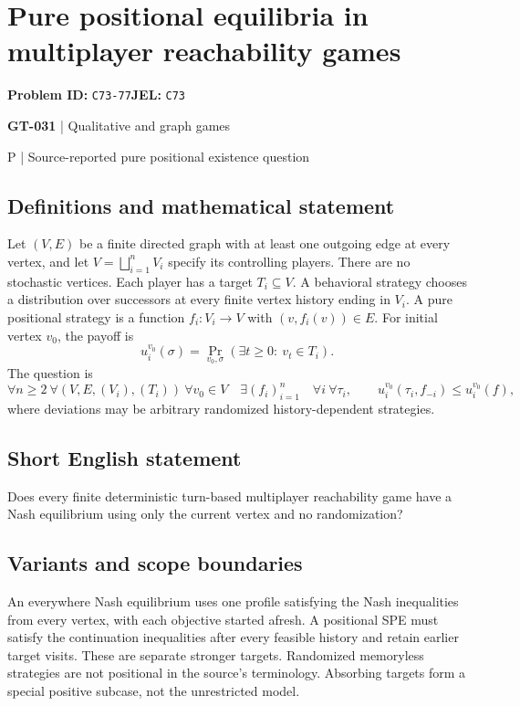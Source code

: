 \documentclass[11pt,a4paper]{article}
\begin{document}
\section*{Pure positional equilibria in multiplayer reachability games}
\textbf{Problem ID:} \texttt{C73-77}\quad \textbf{JEL:} \texttt{C73}\par
\label{problem:OP-0161}
\label{game:GT-031}
{\sffamily\small\color{muted}
{\sffamily\small\color{muted}\textbf{GT-031} | Qualitative and graph games\par P | Source-reported pure positional existence question\par}
\par}
\subsection*{Definitions and mathematical statement}
Let $(V,E)$ be a finite directed graph with at least one outgoing edge at every vertex, and let $V=\bigsqcup_{i=1}^{n}V_i$ specify its controlling players. There are no stochastic vertices. Each player has a target $T_i\subseteq V$. A behavioral strategy chooses a distribution over successors at every finite vertex history ending in $V_i$. A pure positional strategy is a function $f_i:V_i\to V$ with $(v,f_i(v))\in E$. For initial vertex $v_0$, the payoff is
\[
 u_i^{v_0}(\sigma)=\Pr_{v_0,\sigma}(\exists t\geq0:\ v_t\in T_i).
\]
The question is
\[
 \forall n\geq2\ \forall(V,E,(V_i),(T_i))\ \forall v_0\in V
 \quad\exists(f_i)_{i=1}^{n}\quad\forall i\ \forall\tau_i,
 \qquad u_i^{v_0}(\tau_i,f_{-i})\leq u_i^{v_0}(f),
\]
where deviations may be arbitrary randomized history-dependent strategies.
\subsection*{Short English statement}
Does every finite deterministic turn-based multiplayer reachability game have a Nash equilibrium using only the current vertex and no randomization?
\subsection*{Variants and scope boundaries}
An everywhere Nash equilibrium uses one profile satisfying the Nash inequalities from every vertex, with each objective started afresh. A positional SPE must satisfy the continuation inequalities after every feasible history and retain earlier target visits. These are separate stronger targets. Randomized memoryless strategies are not positional in the source's terminology. Absorbing targets form a special positive subcase, not the unrestricted model.
\end{document}
